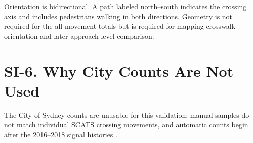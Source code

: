 \documentclass[11pt]{article}
\begin{document}
Orientation is bidirectional. A path labeled north--south indicates the crossing axis and includes pedestrians walking in both directions. Geometry is not required for the all-movement totals but is required for mapping crosswalk orientation and later approach-level comparison.

\section*{SI-6. Why City Counts Are Not Used}

The City of Sydney counts are unusable for this validation: manual samples do not match individual SCATS crossing movements, and automatic counts begin after the 2016--2018 signal histories \citep{cityofsydney2026manualcounts,cityofsydneyAutomaticHourlyPedestrianCount}.

%

\end{document}
